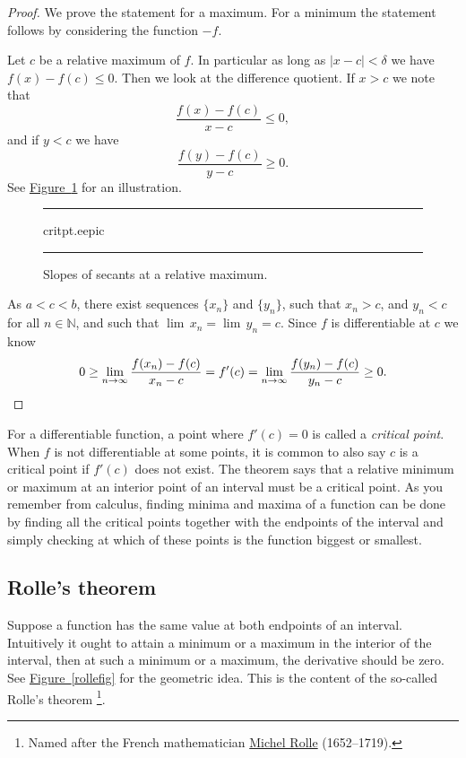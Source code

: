\documentclass[12pt]{book}
\newenvironment{myfigureht}{%
\begin{figure}[h!t]
\noindent\rule{\textwidth}{0.4pt}\vspace{12pt}\par\centering}%
{\par\noindent\rule{\textwidth}{0.4pt}
\end{figure}}
\newcommand{\abs}[1]{\left\lvert {#1} \right\rvert}
\newcommand{\N}{{\mathbb{N}}}
\newcommand{\myindex}[1]{#1\index{#1}}
\theoremstyle{plain}
\theoremstyle{remark}
\theoremstyle{definition}
\theoremstyle{exercise}
\theoremstyle{example}
\newcommand{\figureref}[1]{\hyperref[#1]{Figure~\ref*{#1}}}
\begin{document}
\begin{proof}
We prove the statement for a maximum.  For a minimum the statement
follows by considering the function $-f$.

Let $c$ be a relative maximum of $f$.  In particular as long
as $\abs{x-c} < \delta$ we have $f(x)-f(c) \leq 0$.
Then we look at the difference
quotient.  If $x > c$ we note that
\begin{equation*}
\frac{f(x)-f(c)}{x-c} \leq 0 ,
\end{equation*}
and if $y < c$ we have
\begin{equation*}
\frac{f(y)-f(c)}{y-c} \geq 0 .
\end{equation*}
See \figureref{fig:critpt} for an illustration.
\begin{myfigureht}
{critpt.eepic}
\caption{Slopes of secants at a relative maximum.\label{fig:critpt}}
\end{myfigureht}

As $a < c < b$, there exist
sequences $\{ x_n\}$ and $\{ y_n \}$, such
that $x_n > c$, and
$y_n < c$ for all $n \in \N$, and such that
 $\lim\, x_n = \lim\, y_n = c$.
Since $f$
is differentiable at $c$ we know 
\begin{equation*}
0 \geq \lim_{n\to\infty} \frac{f(x_n)-f(c)}{x_n-c} 
=
f'(c)
=
\lim_{n\to\infty} \frac{f(y_n)-f(c)}{y_n-c} \geq 0.  \qedhere
\end{equation*}
\end{proof}

For a differentiable function, a point where 
$f'(c) = 0$ is called a \emph{\myindex{critical point}}.  When $f$ is not
differentiable at some points,
it is common to also say $c$ is a critical point
if $f'(c)$ does not exist.
The theorem says that a relative minimum or maximum at an interior point
of an interval must be a critical point.
As you remember from calculus, finding minima and maxima of a function can
be done by finding all the critical points together with the endpoints of
the interval and simply checking at which of these points
is the function biggest or smallest.

\subsection{Rolle's theorem}

Suppose a function has the same value at both endpoints of an interval.
Intuitively it ought to attain a minimum or a maximum in the interior of the
interval,
then at such a minimum or a maximum, the derivative should be zero.
See \figureref{rollefig} for the geometric idea.  This is the content of the
so-called Rolle's theorem%
\footnote{Named after the French mathematician
\href{https://en.wikipedia.org/wiki/Michel_Rolle}{Michel Rolle}
(1652--1719).}.
\end{document}
